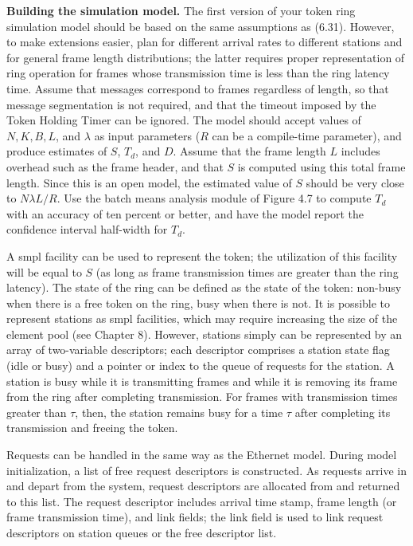 \noindent\textbf{Building the simulation model.} The first version of your token ring simulation model should be based on the same assumptions as (6.31). However, to make extensions easier, plan for different arrival rates to different stations and for general frame length distributions; the latter requires proper representation of ring operation for frames whose transmission time is less than the ring latency time. Assume that messages correspond to frames regardless of length, so that message segmentation is not required, and that the timeout imposed by the Token Holding Timer can be ignored. The model should accept values of $N,K,B,L$, and $\lambda$ as input parameters ($R$ can be a compile-time parameter), and produce estimates of $S$, $T_d$, and $D$. Assume that the frame length $L$ includes overhead such as the frame header, and that $S$ is computed using this total frame length. Since this is an open model, the estimated value of $S$ should be very close to $N\lambda L/R$. Use the batch means analysis module of Figure 4.7 to compute $T_d$ with an accuracy of ten percent or better, and have the model report the confidence interval half-width for $T_d$.

A smpl facility can be used to represent the token; the utilization of this facility will be equal to $S$ (as long as frame transmission times are greater than the ring latency). The state of the ring can be defined as the state of the token: non-busy when there is a free token on the ring, busy when there is not. It is possible to represent stations as smpl facilities, which may require increasing the size of the element pool (see Chapter 8). However, stations simply can be represented by an array of two-variable descriptors; each descriptor comprises a station state flag (idle or busy) and a pointer or index to the queue of requests for the station. A station is busy while it is transmitting frames and while it is removing its frame from the ring after completing transmission. For frames with transmission times greater than $\tau$, then, the station remains busy for a time $\tau$ after completing its transmission and freeing the token.

Requests can be handled in the same way as the Ethernet model. During model initialization, a list of free request descriptors is constructed. As requests arrive in and depart from the system, request descriptors are allocated from and returned to this list. The request descriptor includes arrival time stamp, frame length (or frame transmission time), and link fields; the link field is used to link request descriptors on station queues or the free descriptor list.

